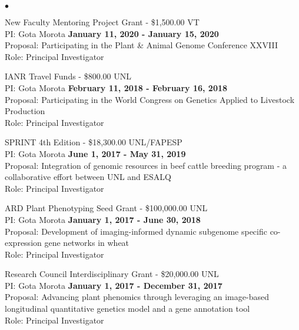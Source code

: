 \documentclass[margin,line,10pt]{res}
\newenvironment{list2}{
  \begin{list}{$\bullet$}{%
      \setlength{\itemsep}{0in}
      \setlength{\parsep}{0in} \setlength{\parskip}{0in}
      \setlength{\topsep}{0in} \setlength{\partopsep}{0in} 
      \setlength{\leftmargin}{0.2in}}}{\end{list}}
\begin{document}
\begin{resume}
\begin{list2}
\vspace{0.5cm}

\item New Faculty Mentoring Project Grant  - \$1,500.00  \hfill VT\\
PI: Gota Morota   \hfill \textbf{January 11, 2020 - January 15, 2020}\\
Proposal: Participating in the Plant \& Animal Genome Conference XXVIII\\
Role: Principal Investigator \\


\vspace{0.5cm}

\item IANR Travel Funds  - \$800.00  \hfill UNL\\
PI: Gota Morota   \hfill \textbf{February 11, 2018 - February 16, 2018}\\
Proposal: Participating in the World Congress on Genetics Applied to Livestock Production  \\
Role: Principal Investigator \\


\vspace{0.5cm}

\item SPRINT 4th Edition  - \$18,300.00  \hfill UNL/FAPESP\\
PI: Gota Morota   \hfill \textbf{June 1, 2017 - May 31, 2019}\\
Proposal: Integration of genomic resources in beef cattle breeding program - a collaborative effort between UNL and ESALQ  \\
Role: Principal Investigator \\


\vspace{0.5cm}
  
\item ARD Plant Phenotyping Seed Grant  - \$100,000.00  \hfill UNL\\
PI: Gota Morota   \hfill \textbf{January 1, 2017 - June 30, 2018}\\
Proposal: Development of imaging-informed dynamic subgenome specific co-expression gene networks in wheat  \\
Role: Principal Investigator \\

\vspace{0.5cm}

\item Research Council Interdisciplinary Grant  - \$20,000.00  \hfill UNL\\
PI: Gota Morota   \hfill \textbf{January 1, 2017 - December 31, 2017}\\
Proposal: Advancing plant phenomics through leveraging an image-based longitudinal quantitative genetics model and a gene annotation tool  \\
Role: Principal Investigator \\


\end{list2}
\end{resume}
\end{document}
